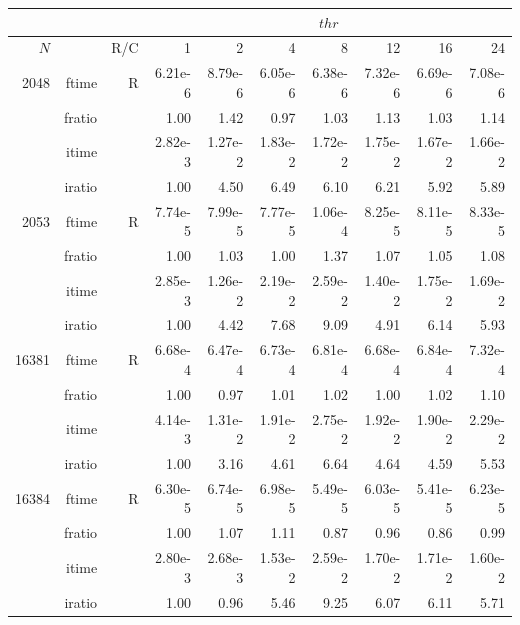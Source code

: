 \documentclass[a4paper]{article}
\begin{document}
\begin{table}[htbp]
\begin{center}
\begin{small}
\begin{tabular}{|r|r|r|r|r|r|r|r|r|r|}
\hline 
     \multicolumn{3}{|c|}{ } & \multicolumn{7}{c|}{$thr$} \\ \hline
    $N$  & & R/C  & 1           & 2    & 4    & 8    & 12   & 16    & 24  \\ \hline\hline
    2048  & ftime & R  &  6.21e-6 &   8.79e-6 &   6.05e-6 &   6.38e-6 &   7.32e-6 &   6.69e-6 &   7.08e-6  \\ 
      & fratio & & 1.00 &   1.42 &   0.97 &   1.03 &   1.13 &   1.03 &   1.14   \\ 
     & itime & &    2.82e-3 &   1.27e-2 &   1.83e-2 &   1.72e-2 &   1.75e-2 &   1.67e-2 &   1.66e-2   \\ 
     & iratio & &   1.00 &   4.50 &   6.49 &   6.10 &   6.21 &   5.92 &   5.89    \\ \hline 
    2053  & ftime & R &  7.74e-5 & 7.99e-5 &   7.77e-5 &   1.06e-4 &   8.25e-5 &   8.11e-5 &   8.33e-5    \\ 
      & fratio & &  1.00 &   1.03 &   1.00 &   1.37 &   1.07 &   1.05 &   1.08   \\ 
     & itime &  &   2.85e-3 &   1.26e-2 &   2.19e-2 &   2.59e-2 &   1.40e-2 &   1.75e-2 &   1.69e-2    \\ 
    & iratio &  &     1.00 &   4.42 &   7.68 &   9.09 &   4.91 &   6.14 &   5.93     \\ \hline 
  16381  & ftime & R &  6.68e-4 &   6.47e-4 &   6.73e-4 &   6.81e-4 &   6.68e-4 &   6.84e-4 &   7.32e-4      \\ 
      & fratio & &  1.00 &   0.97 &   1.01 &   1.02 &   1.00 &   1.02 &   1.10    \\ 
     & itime & &   4.14e-3 &   1.31e-2 &   1.91e-2 &   2.75e-2 &   1.92e-2 &   1.90e-2 &   2.29e-2    \\ 
     & iratio & &  1.00 &   3.16 &   4.61 &   6.64 &   4.64 &   4.59 &   5.53     \\ \hline 
 16384  & ftime & R &  6.30e-5 &   6.74e-5 &   6.98e-5 &   5.49e-5 &   6.03e-5 &   5.41e-5 &   6.23e-5   \\ 
      & fratio & &   1.00 &   1.07 &   1.11 &   0.87 &  0.96 &   0.86 &   0.99 \\
     & itime & &  2.80e-3 &   2.68e-3 &   1.53e-2 &   2.59e-2 &   1.70e-2 &   1.71e-2 &   1.60e-2   \\ 
 & iratio & &  1.00 &   0.96 &   5.46 &   9.25 &   6.07 &   6.11 &   5.71   \\  \hline 

\end{tabular}
\end{small}
\end{center}
\end{table}
\end{document}
